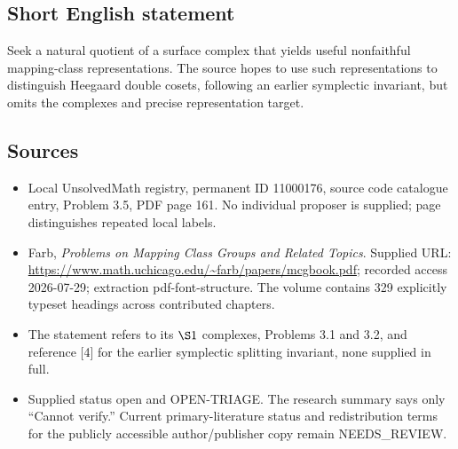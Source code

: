 \documentclass[11pt]{article}
\begin{document}
\subsection{Short English statement}
Seek a natural quotient of a surface complex that yields useful nonfaithful mapping-class representations. The source hopes to use such representations to distinguish Heegaard double cosets, following an earlier symplectic invariant, but omits the complexes and precise representation target.
\subsection{Sources}
\begin{itemize}
\item Local UnsolvedMath registry, permanent ID 11000176, source code catalogue entry, Problem 3.5, PDF page 161. No individual proposer is supplied; page distinguishes repeated local labels.
\item Farb, \emph{Problems on Mapping Class Groups and Related Topics}. Supplied URL: \url{https://www.math.uchicago.edu/~farb/papers/mcgbook.pdf}; recorded access 2026-07-29; extraction pdf-font-structure. The volume contains 329 explicitly typeset headings across contributed chapters.
\item The statement refers to its \(\S1\) complexes, Problems 3.1 and 3.2, and reference [4] for the earlier symplectic splitting invariant, none supplied in full.
\item Supplied status open and OPEN-TRIAGE. The research summary says only ``Cannot verify.'' Current primary-literature status and redistribution terms for the publicly accessible author/publisher copy remain NEEDS\_REVIEW.
\end{itemize}
\end{document}
